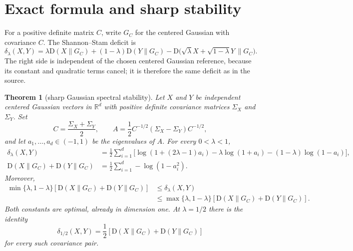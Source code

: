 \documentclass[11pt]{article}
\newtheorem{theorem}{Theorem}
\newcommand{\D}{\mathrm D}
\begin{document}
\section{Exact formula and sharp stability}

For a positive definite matrix $C$, write $G_C$ for the centered Gaussian
with covariance $C$.  The Shannon--Stam deficit is
\[
 \delta_{\lambda}(X,Y)
 =\lambda\D(X\|G_C)+(1-\lambda)\D(Y\|G_C)
 -\D\bigl(\sqrt\lambda X+\sqrt{1-\lambda}Y\,\|G_C\bigr).
\]
The right side is independent of the chosen centered Gaussian reference,
because its constant and quadratic terms cancel; it is therefore the same
deficit as in the source.

\begin{theorem}[sharp Gaussian spectral stability]\label{thm:main}
Let $X$ and $Y$ be independent centered Gaussian vectors in $\mathbb R^d$
with positive definite covariance matrices $\Sigma_X$ and $\Sigma_Y$.  Set
\[
 C=\frac{\Sigma_X+\Sigma_Y}{2},\qquad
 A=\frac12 C^{-1/2}(\Sigma_X-\Sigma_Y)C^{-1/2},
\]
and let $a_1,\ldots,a_d\in(-1,1)$ be the eigenvalues of $A$.  For every
$0<\lambda<1$,
\begin{align}
 \delta_\lambda(X,Y)
 &=\frac12\sum_{i=1}^d\bigl[
 \log(1+(2\lambda-1)a_i)-\lambda\log(1+a_i)
 -(1-\lambda)\log(1-a_i)\bigr],\label{eq:deficit}\\
 \D(X\|G_C)+\D(Y\|G_C)
 &=\frac12\sum_{i=1}^d-\log(1-a_i^2).\label{eq:entropy}
\end{align}
Moreover,
\begin{align}
 \min\{\lambda,1-\lambda\}
 [\D(X\|G_C)+\D(Y\|G_C)]
 &\leq \delta_\lambda(X,Y)\label{eq:lower}\\
 &\leq \max\{\lambda,1-\lambda\}
 [\D(X\|G_C)+\D(Y\|G_C)].\label{eq:upper}
\end{align}
Both constants are optimal, already in dimension one.  At $\lambda=1/2$
there is the identity
\[
 \delta_{1/2}(X,Y)
 =\frac12[\D(X\|G_C)+\D(Y\|G_C)]
\]
for every such covariance pair.
\end{theorem}
\end{document}
